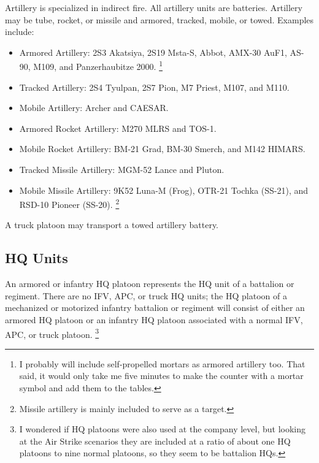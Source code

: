 \documentclass[10pt]{article}
\newcommand{\note}[1]{%
    \footnote{%
        \setlength{\parindent}{0pt}%
        \setlength{\parskip}{\smallskipamount}%
        #1
    }%
}
\begin{document}
Artillery is specialized in indirect fire. All artillery units are batteries. Artillery may be tube, rocket, or missile and armored, tracked, mobile, or towed. Examples include:

\begin{itemize}\raggedright

    \item Armored Artillery: 2S3 Akatsiya, 2S19 Msta-S, Abbot, AMX-30 AuF1, AS-90, M109, and Panzerhaubitze 2000.
        \note{
            I probably will include self-propelled mortars as armored artillery too. That said, it would only take me five minutes to make the counter with a mortar symbol and add them to the tables.
        }

    \item Tracked Artillery: 2S4 Tyulpan, 2S7 Pion, M7 Priest, M107, and M110.

    \item Mobile Artillery: Archer and CAESAR.

    \item Armored Rocket Artillery: M270 MLRS and TOS-1.

    \item Mobile Rocket Artillery: BM-21 Grad, BM-30 Smerch, and M142 HIMARS.

    \item Tracked Missile Artillery: MGM-52 Lance and Pluton.

    \item Mobile Missile Artillery: 9K52 Luna-M (Frog), OTR-21 Tochka (SS-21), and RSD-10 Pioneer (SS-20).%
        \note{
            Missile artillery is mainly included to serve as a target.
        }

\end{itemize}

A truck platoon may transport a towed artillery battery.

\subsection{HQ Units}

An armored or infantry HQ platoon represents the HQ unit of a battalion or regiment. There are no IFV, APC, or truck HQ units; the HQ platoon of a mechanized or motorized infantry battalion or regiment will consist of either an armored HQ platoon or an infantry HQ platoon associated with a normal IFV, APC, or truck platoon.%
\note{
    I wondered if HQ platoons were also used at the company level, but looking at the Air Strike scenarios they are included at a ratio of about one HQ platoons to nine normal platoons, so they seem to be battalion HQs.
}
\end{document}
